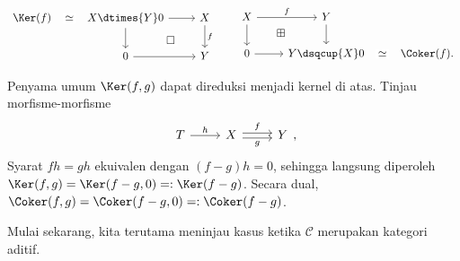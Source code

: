\begin{equation}\label{eqn:Ker-Coker-triangles}
	\begin{tikzcd}
		\Ker(f) \arrow[phantom, r, "\simeq" description] & X \dtimes{Y} 0 \arrow[r] \arrow[d] \arrow[phantom, rd, "\Box" description] & X \arrow[d, "f"] \\
		& 0 \arrow[r] & Y
	\end{tikzcd} \qquad \begin{tikzcd}
		X \arrow[r, "f"] \arrow[d] & Y \arrow[d] & \\
		0 \arrow[r] & Y \dsqcup{X} 0 \arrow[phantom, lu, "\boxplus" description] & \Coker(f) \arrow[phantom, l, "\simeq" description] .
\end{tikzcd}\end{equation}

\begin{catatan}\label{rem:equalizer-Ker}
	Penyama umum $\Ker(f,g)$ dapat direduksi menjadi kernel di atas. Tinjau
	morfisme-morfisme
	\[\begin{tikzcd}
	T \arrow[r, "h"] & X \arrow[r, yshift=0.2em, "f"] \arrow[r, yshift=-0.2em, "g"'] & Y
	\end{tikzcd}, \]
	Syarat $fh=gh$ ekuivalen dengan $(f-g)h=0$, sehingga langsung diperoleh
	$\Ker(f,g)=\Ker(f-g,0)=:\Ker(f-g)$. Secara dual,
	$\Coker(f,g)=\Coker(f-g,0)=:\Coker(f-g)$.
\end{catatan}

Mulai sekarang, kita terutama meninjau kasus ketika $\mathcal{C}$ merupakan
kategori aditif.

